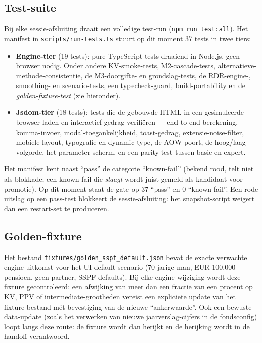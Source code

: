 \documentclass[11pt,a4paper]{article}
\newcommand{\code}[1]{\texttt{#1}}
\begin{document}
\subsection{Test-suite}

Bij elke sessie-afsluiting draait een volledige test-run (\code{npm run test:all}). Het manifest in \code{scripts/run-tests.ts} stuurt op dit moment 37 tests in twee tiers:

\begin{itemize}
\item \textbf{Engine-tier} (19 tests): pure TypeScript-tests draaiend in Node.js, geen browser nodig. Onder andere KV-smoke-tests, M2-cascade-tests, alternatieve-methode-consistentie, de M3-doorgifte- en grondslag-tests, de RDR-engine-, smoothing- en scenario-tests, een typecheck-guard, build-portability en de \emph{golden-fixture-test} (zie hieronder).
\item \textbf{Jsdom-tier} (18 tests): tests die de gebouwde HTML in een gesimuleerde browser laden en interactief gedrag verifi\"eren --- end-to-end-berekening, komma-invoer, modal-toegankelijkheid, toast-gedrag, extensie-noise-filter, mobiele layout, typografie en dynamic type, de AOW-poort, de hoog/laag-volgorde, het parameter-scherm, en een parity-test tussen basic en expert.
\end{itemize}

Het manifest kent naast ``pass'' de categorie ``known-fail'' (bekend rood, telt niet als blokkade; een known-fail die \emph{slaagt} wordt juist gemeld als kandidaat voor promotie). Op dit moment staat de gate op 37 ``pass'' en 0 ``known-fail''. Een rode uitslag op een pass-test blokkeert de sessie-afsluiting: het snapshot-script weigert dan een restart-set te produceren.

\subsection{Golden-fixture}

Het bestand \code{fixtures/}\allowbreak\code{golden\_sspf\_default.json} bevat de exacte verwachte engine-uitkomst voor het UI-default-scenario (70-jarige man, EUR 100.000 pensioen, geen partner, SSPF-defaults). Bij elke engine-wijziging wordt deze fixture gecontroleerd: een afwijking van meer dan een fractie van een procent op KV, PPV of intermediate-grootheden vereist een expliciete update van het fixture-bestand mét bevestiging van de nieuwe ``ankerwaarde''. Ook een bewuste data-update (zoals het verwerken van nieuwe jaarverslag-cijfers in de fondsconfig) loopt langs deze route: de fixture wordt dan herijkt en de herijking wordt in de handoff verantwoord.
\end{document}
